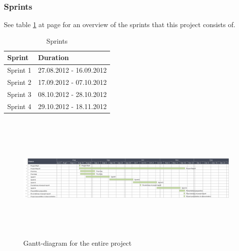 \subsubsection*{Sprints}
See table \ref{tab:sprints} at page \pageref{tab:sprints} for an overview of the sprints that this project consists of.
\begin{table}
\begin{tabular}{l|l} \hline
\textbf{Sprint} & \textbf{Duration} \\ \hline \hline
Sprint 1 &  27.08.2012 - 16.09.2012\\
Sprint 2 & 17.09.2012 - 07.10.2012\\
Sprint 3 & 08.10.2012 - 28.10.2012\\
Sprint 4 & 29.10.2012 - 18.11.2012\\ \hline
\end{tabular}
\caption{Sprints} \label{tab:sprints}
\end{table}

\begin{figure}[htb]
\begin{center}
\includegraphics[width=\textwidth, height=2.5in]{foo}
\caption{Gantt-diagram for the entire project}
\end{center}
\end{figure}